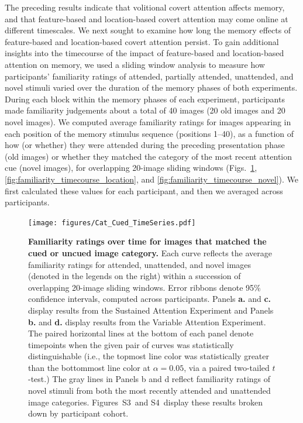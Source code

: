 \documentclass[english]{article}
\newcommand{\timecourseCuedCategory}{S3}
\newcommand{\timecourseUncuedCategory}{S4}
\begin{document}
The preceding results indicate that volitional covert attention affects memory,
and that feature-based and location-based covert attention may come online at
different timescales. We next sought to examine how long the memory effects of
feature-based and location-based covert attention persist. To gain additional
insights into the timecourse of the impact of feature-based and location-based
attention on memory, we used a sliding window analysis to measure how
participants' familiarity ratings of attended, partially attended, unattended,
and novel stimuli varied over the duration of the memory phases of both
experiments. During each block within the memory phases of each experiment,
participants made familiarity judgements about a total of 40 images (20 old
images and 20 novel images). We computed average familiarity ratings for images
appearing in each position of the memory stimulus sequence (positions 1--40),
as a function of how (or whether) they were attended during the preceding
presentation phase (old images) or whether they matched the category of the
most recent attention cue (novel images), for overlapping 20-image sliding
windows (Figs.~\ref{fig:familiarity_timecourse_category},
\ref{fig:familiarity_timecourse_location}, and
\ref{fig:familiarity_timecourse_novel}). We first calculated these values for
each participant, and then we averaged across participants.

\begin{figure}[tp]
  \centering
  \texttt{[image: figures/Cat\_Cued\_TimeSeries.pdf]}

  \caption{\textbf{Familiarity ratings over time for images that matched the
  cued or uncued image category.} Each curve reflects the average familiarity
  ratings for attended, unattended, and novel images (denoted in the legends on
  the right) within a succession of overlapping 20-image sliding windows. Error
  ribbons denote 95\% confidence intervals, computed across participants.
  Panels \textbf{a.} and \textbf{c.} display results from the Sustained
  Attention Experiment and Panels \textbf{b.} and \textbf{d.} display results
  from the Variable Attention Experiment. The paired horizontal lines at the
  bottom of each panel denote timepoints when the given pair of curves was
  statistically distinguishable (i.e., the topmost line color was statistically
  greater than the bottommost line color at $\alpha = 0.05$, via a paired
  two-tailed $t$-test.) The gray lines in Panels b and d reflect familiarity
  ratings of novel stimuli from both the most recently attended and unattended
  image categories. Figures~\timecourseCuedCategory~and
  \timecourseUncuedCategory~display these results broken down by participant
  cohort.}

\label{fig:familiarity_timecourse_category}
\end{figure}
\end{document}
